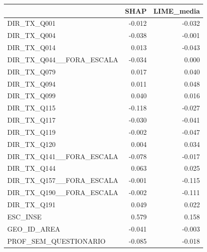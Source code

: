 \begin{tabular}{lrr}
\toprule
 & SHAP & LIME\_media \\
\midrule
DIR\_TX\_Q001 & -0.012 & -0.032 \\
DIR\_TX\_Q004 & -0.038 & -0.001 \\
DIR\_TX\_Q014 & 0.013 & -0.043 \\
DIR\_TX\_Q044\_\_FORA\_ESCALA & -0.034 & 0.000 \\
DIR\_TX\_Q079 & 0.017 & 0.040 \\
DIR\_TX\_Q094 & 0.011 & 0.048 \\
DIR\_TX\_Q099 & 0.040 & 0.016 \\
DIR\_TX\_Q115 & -0.118 & -0.027 \\
DIR\_TX\_Q117 & -0.030 & -0.041 \\
DIR\_TX\_Q119 & -0.002 & -0.047 \\
DIR\_TX\_Q120 & 0.004 & 0.034 \\
DIR\_TX\_Q141\_\_FORA\_ESCALA & -0.078 & -0.017 \\
DIR\_TX\_Q144 & 0.063 & 0.025 \\
DIR\_TX\_Q157\_\_FORA\_ESCALA & -0.001 & -0.115 \\
DIR\_TX\_Q190\_\_FORA\_ESCALA & -0.002 & -0.111 \\
DIR\_TX\_Q191 & 0.049 & 0.022 \\
ESC\_INSE & 0.579 & 0.158 \\
GEO\_ID\_AREA & -0.041 & -0.003 \\
PROF\_SEM\_QUESTIONARIO & -0.085 & -0.018 \\
\bottomrule
\end{tabular}
